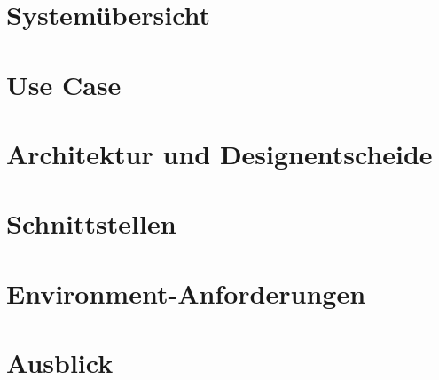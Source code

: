 \documentclass[a4paper, 10pt, fleqn]{article}
\begin{document}


\tableofcontents
\clearpage



\clearpage

\section{Systemübersicht}




\section{Use Case}



\section{Architektur und Designentscheide}



\section{Schnittstellen}


\section{Environment-Anforderungen}


\section{Ausblick}

\end{document}

